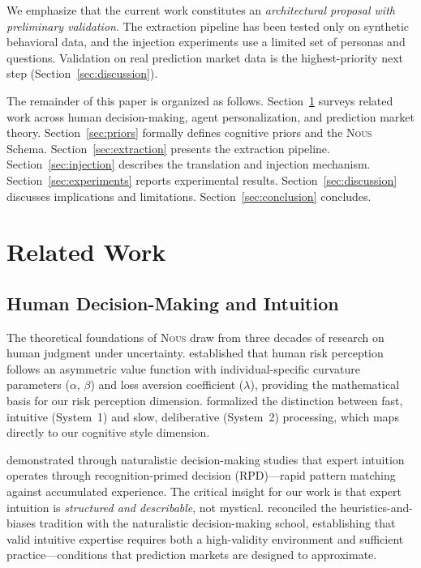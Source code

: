 \documentclass[11pt]{article}
\newcommand{\nous}{\textsc{Nous}}
\begin{document}
We emphasize that the current work constitutes an \emph{architectural proposal with preliminary validation}. The extraction pipeline has been tested only on synthetic behavioral data, and the injection experiments use a limited set of personas and questions. Validation on real prediction market data is the highest-priority next step (Section~\ref{sec:discussion}).

The remainder of this paper is organized as follows. Section~\ref{sec:related} surveys related work across human decision-making, agent personalization, and prediction market theory. Section~\ref{sec:priors} formally defines cognitive priors and the \nous{} Schema. Section~\ref{sec:extraction} presents the extraction pipeline. Section~\ref{sec:injection} describes the translation and injection mechanism. Section~\ref{sec:experiments} reports experimental results. Section~\ref{sec:discussion} discusses implications and limitations. Section~\ref{sec:conclusion} concludes.


\section{Related Work}
\label{sec:related}

\subsection{Human Decision-Making and Intuition}

The theoretical foundations of \nous{} draw from three decades of research on human judgment under uncertainty. \citet{kahneman1979prospect} established that human risk perception follows an asymmetric value function with individual-specific curvature parameters ($\alpha$, $\beta$) and loss aversion coefficient ($\lambda$), providing the mathematical basis for our risk perception dimension. \citet{kahneman2011thinking} formalized the distinction between fast, intuitive (System~1) and slow, deliberative (System~2) processing, which maps directly to our cognitive style dimension.

\citet{klein1998sources} demonstrated through naturalistic decision-making studies that expert intuition operates through recognition-primed decision (RPD)---rapid pattern matching against accumulated experience. The critical insight for our work is that expert intuition is \emph{structured and describable}, not mystical. \citet{kahneman2009conditions} reconciled the heuristics-and-biases tradition with the naturalistic decision-making school, establishing that valid intuitive expertise requires both a high-validity environment and sufficient practice---conditions that prediction markets are designed to approximate.
\end{document}
